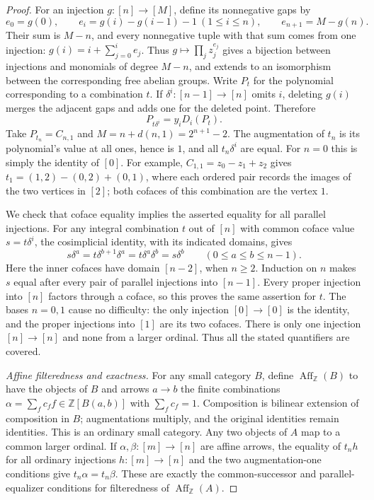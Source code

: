\documentclass[11pt,a4paper]{article}
\theoremstyle{definition}
\theoremstyle{remark}
\newcommand{\Z}{\mathbb Z}
\newcommand{\Aff}{\operatorname{Aff}}
\begin{document}
\begin{proof}
For an injection $g:[n]\to[M]$, define its nonnegative gaps by
\[
 e_0=g(0),\qquad
 e_i=g(i)-g(i-1)-1\ (1\leq i\leq n),\qquad
 e_{n+1}=M-g(n).
\]
Their sum is $M-n$, and every nonnegative tuple with that sum
comes from one injection: $g(i)=i+\sum_{j=0}^{i}e_j$.
Thus $g\mapsto\prod_jz_j^{e_j}$ gives a bijection between
injections and monomials of degree $M-n$, and extends to an
isomorphism between the corresponding free abelian groups.
Write $P_t$ for the polynomial corresponding to a combination $t$.
If $\delta^i:[n-1]\to[n]$ omits $i$, deleting $g(i)$ merges
the adjacent gaps and adds one for the deleted point.  Therefore
\[
 P_{t\delta^i}=y_iD_i(P_t).
\]
Take $P_{t_n}=C_{n,1}$ and
$M=n+d(n,1)=2^{n+1}-2$.  The augmentation of $t_n$ is its
polynomial's value at all ones, hence is $1$, and all
$t_n\delta^i$ are equal.  For $n=0$ this is simply the identity
of $[0]$.
For example, $C_{1,1}=z_0-z_1+z_2$ gives
$t_1=(1,2)-(0,2)+(0,1)$, where each ordered pair records the
images of the two vertices in $[2]$; both cofaces of this
combination are the vertex $1$.

We check that coface equality implies the asserted equality for
all parallel injections.  For any integral combination $t$ out of
$[n]$ with common coface value $s=t\delta^i$, the cosimplicial
identity, with its indicated domains, gives
\[
 s\delta^a=t\delta^{b+1}\delta^a
          =t\delta^a\delta^b=s\delta^b
 \qquad(0\leq a\leq b\leq n-1).
\]
Here the inner cofaces have domain $[n-2]$, when $n\geq2$.
Induction on $n$ makes $s$ equal after every pair of parallel
injections into $[n-1]$.  Every proper injection into $[n]$
factors through a coface, so this proves the same assertion for
$t$.  The bases $n=0,1$ cause no difficulty: the only injection
$[0]\to[0]$ is the identity, and the proper injections into
$[1]$ are its two cofaces.  There is only one injection
$[n]\to[n]$ and none from a larger ordinal.  Thus all the stated
quantifiers are covered.

\emph{Affine filteredness and exactness.}
For any small category $B$, define $\Aff_{\Z}(B)$ to have the
objects of $B$ and arrows $a\to b$ the finite combinations
$\alpha=\sum_f c_ff\in\Z[B(a,b)]$ with $\sum_fc_f=1$.
Composition is bilinear extension of composition in $B$;
augmentations multiply, and the original identities remain
identities.  This is an ordinary small category.
Any two objects of $A$ map to a common larger ordinal.  If
$\alpha,\beta:[m]\to[n]$ are affine arrows, the equality of
$t_nh$ for all ordinary injections $h:[m]\to[n]$ and the two
augmentation-one conditions give $t_n\alpha=t_n\beta$.
These are exactly the common-successor and parallel-equalizer
conditions for filteredness of $\Aff_{\Z}(A)$.


\end{proof}
\end{document}
